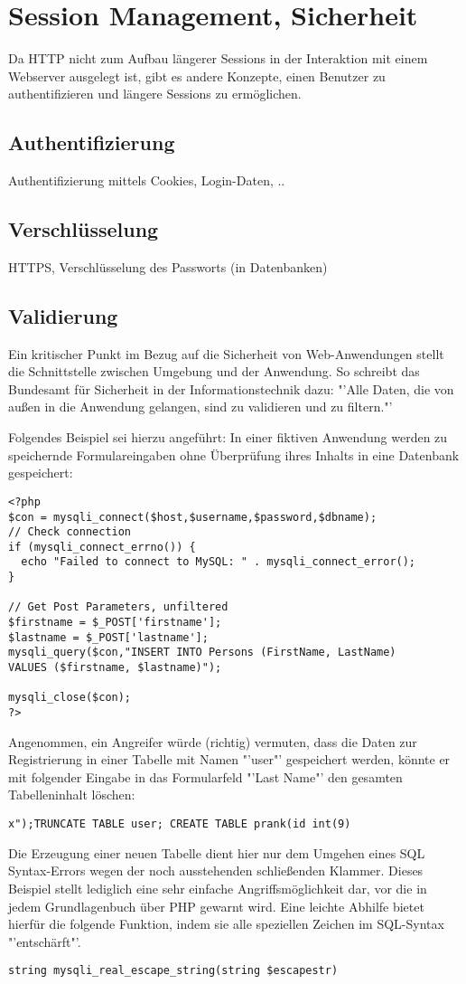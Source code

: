 \documentclass[12pt]{report}
\begin{document}
\section{Session Management, Sicherheit}
Da HTTP nicht zum Aufbau längerer Sessions in der Interaktion mit einem Webserver ausgelegt ist, gibt es andere Konzepte, einen Benutzer zu authentifizieren und längere Sessions zu ermöglichen.
\subsection{Authentifizierung}
Authentifizierung mittels Cookies, Login-Daten, ..
\subsection{Verschlüsselung}
HTTPS, Verschlüsselung des Passworts (in Datenbanken)
\subsection{Validierung}
Ein kritischer Punkt im Bezug auf die Sicherheit von Web-Anwendungen stellt die Schnittstelle zwischen Umgebung und der Anwendung. \cite[S.212]{ebooks:Architekturen} So schreibt das Bundesamt für Sicherheit in der Informationstechnik dazu: "'Alle Daten, die von außen in die Anwendung gelangen, sind zu validieren und zu filtern."'
\cite[S.20]{BSI}

Folgendes Beispiel sei hierzu angeführt: 
In einer fiktiven Anwendung werden zu speichernde Formulareingaben ohne Überprüfung ihres Inhalts in eine Datenbank gespeichert:

\begin{lstlisting}
<?php
$con = mysqli_connect($host,$username,$password,$dbname);
// Check connection
if (mysqli_connect_errno()) {
  echo "Failed to connect to MySQL: " . mysqli_connect_error();
}

// Get Post Parameters, unfiltered
$firstname = $_POST['firstname'];
$lastname = $_POST['lastname'];
mysqli_query($con,"INSERT INTO Persons (FirstName, LastName)
VALUES ($firstname, $lastname)");

mysqli_close($con);
?>
\end{lstlisting}

Angenommen, ein Angreifer würde (richtig) vermuten, dass die Daten zur Registrierung in einer Tabelle mit Namen "'user"' gespeichert werden, könnte er mit folgender Eingabe in das Formularfeld "'Last Name"' den gesamten Tabelleninhalt löschen:
\begin{lstlisting}
x");TRUNCATE TABLE user; CREATE TABLE prank(id int(9)
\end{lstlisting}
Die Erzeugung einer neuen Tabelle dient hier nur dem Umgehen eines SQL Syntax-Errors wegen der noch ausstehenden schließenden Klammer.
Dieses Beispiel stellt lediglich eine sehr einfache Angriffsmöglichkeit dar, vor die in jedem Grundlagenbuch über PHP gewarnt wird. Eine leichte Abhilfe bietet hierfür die folgende Funktion, indem sie alle speziellen Zeichen im SQL-Syntax "'entschärft"'.
\begin{lstlisting}
string mysqli_real_escape_string(string $escapestr)
\end{lstlisting}
\end{document}
